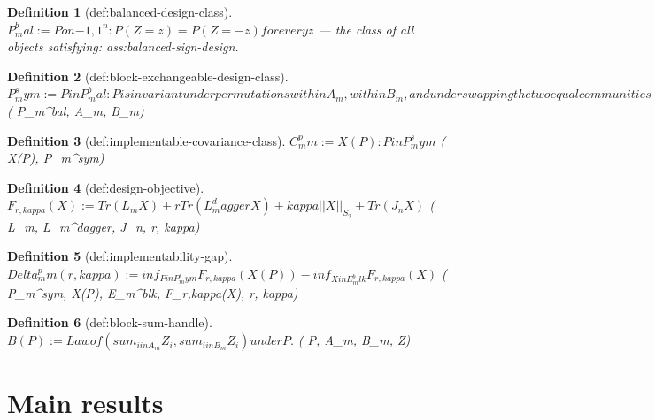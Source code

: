 \documentclass{article}
\newtheorem{definition}{Definition}
\begin{document}
\begin{definition}[def:balanced-design-class]\label{def:balanced-design-class}
$P_m^bal := { P on {-1,1}^n : P(Z=z)=P(Z=-z) for every z }$ --- the class of all objects satisfying: ass:balanced-sign-design.
\end{definition}

\begin{definition}[def:block-exchangeable-design-class]\label{def:block-exchangeable-design-class}
$P_m^sym := { P in P_m^bal : P is invariant under permutations within A_m, within B_m, and under swapping the two equal communities }$ \quad ( P_m^bal, A_m, B_m)
\end{definition}

\begin{definition}[def:implementable-covariance-class]\label{def:implementable-covariance-class}
$C_m^pm := { X(P) : P in P_m^sym }$ \quad ( X(P), P_m^sym)
\end{definition}

\begin{definition}[def:design-objective]\label{def:design-objective}
$F_{r,kappa}(X) := Tr(L_m X) + r Tr(L_m^dagger X) + kappa ||X||_{S_2} + Tr(J_n X)$ \quad ( L_m, L_m^dagger, J_n, r, kappa)
\end{definition}

\begin{definition}[def:implementability-gap]\label{def:implementability-gap}
$Delta_m^pm(r,kappa) := inf_{P in P_m^sym} F_{r,kappa}(X(P)) - inf_{X in E_m^blk} F_{r,kappa}(X)$ \quad ( P_m^sym, X(P), E_m^blk, F_{r,kappa}(X), r, kappa)
\end{definition}

\begin{definition}[def:block-sum-handle]\label{def:block-sum-handle}
$B(P) := Law of (sum_{i in A_m} Z_i, sum_{i in B_m} Z_i) under P.$ \quad ( P, A_m, B_m, Z)
\end{definition}

\section{Main results}
\end{document}

